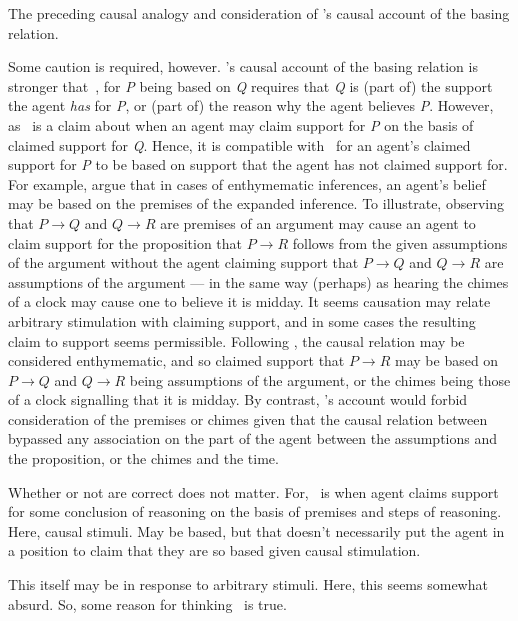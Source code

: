 \begin{note}
  The preceding causal analogy and consideration of \citeauthor{Moser:1989tv}'s causal account of the basing relation.

  Some caution is required, however.
  \citeauthor{Moser:1989tv}'s causal account of the basing relation is stronger that~\ESU{}, for \emph{P} being based on \emph{Q} requires that \emph{Q} is (part of) the support the agent \emph{has} for \emph{P}, or (part of) the reason why the agent believes \emph{P}.
  However, as~\ESU{} is a claim about when an agent may claim support for \emph{P} on the basis of claimed support for \emph{Q}.
  Hence, it is compatible with~\ESU{} for an agent's claimed support for \emph{P} to be based on support that the agent has not claimed support for.
  For example, \textcite{Moretti:2019wx} argue that in cases of enthymematic inferences, an agent's belief may be based on the premises of the expanded inference.
  To illustrate, observing that \(P \rightarrow Q\) and \(Q \rightarrow R\) are premises of an argument may cause an agent to claim support for the proposition that \(P \rightarrow R\) follows from the given assumptions of the argument without the agent claiming support that \(P \rightarrow Q\) and \(Q \rightarrow R\) are assumptions of the argument --- in the same way (perhaps) as hearing the chimes of a clock may cause one to believe it is midday.
  It seems causation may relate arbitrary stimulation with claiming support, and in some cases the resulting claim to support seems permissible.
  Following \citeauthor{Moretti:2019wx}, the causal relation may be considered enthymematic, and so claimed support that \(P \rightarrow R\) may be based on \(P \rightarrow Q\) and \(Q \rightarrow R\) being assumptions of the argument, or the chimes being those of a clock signalling that it is midday.
  By contrast, \citeauthor{Moser:1989tv}'s account would forbid consideration of the premises or chimes given that the causal relation between bypassed any association on the part of the agent between the assumptions and the proposition, or the chimes and the time.

  Whether or not \parencite{Moretti:2019wx} are correct does not matter.
  For,~\ESU{} is when agent claims support for some conclusion of reasoning on the basis of premises and steps of reasoning.
  Here, causal stimuli.
  May be based, but that doesn't necessarily put the agent in a position to claim that they are so based given causal stimulation.

  This itself may be in response to arbitrary stimuli.
  Here, this seems somewhat absurd.
  So, some reason for thinking~\ESU{} is true.
\end{note}

